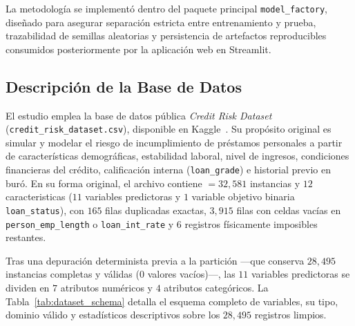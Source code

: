 \documentclass[conference]{IEEEtran}
\begin{document}
La metodología se implementó dentro del paquete principal \texttt{model\_factory}, diseñado para asegurar separación estricta entre entrenamiento y prueba, trazabilidad de semillas aleatorias y persistencia de artefactos reproducibles consumidos posteriormente por la aplicación web en Streamlit.

\subsection{Descripción de la Base de Datos}

El estudio emplea la base de datos pública \textit{Credit Risk Dataset} (\texttt{credit\_risk\_dataset.csv}), disponible en Kaggle~\cite{laotse_credit_risk}. Su propósito original es simular y modelar el riesgo de incumplimiento de préstamos personales a partir de características demográficas, estabilidad laboral, nivel de ingresos, condiciones financieras del crédito, calificación interna (\texttt{loan\_grade}) e historial previo en buró. En su forma original, el archivo contiene $=32{,}581$ instancias y $12$ caracteristicas ($11$ variables predictoras y $1$ variable objetivo binaria \texttt{loan\_status}), con $165$ filas duplicadas exactas, $3{,}915$ filas con celdas vacías en \texttt{person\_emp\_length} o \texttt{loan\_int\_rate} y $6$ registros físicamente imposibles restantes.

Tras una depuración determinista previa a la partición —que conserva $28{,}495$ instancias completas y válidas ($0$ valores vacíos)—, las $11$ variables predictoras se dividen en $7$ atributos numéricos y $4$ atributos categóricos. La Tabla~\ref{tab:dataset_schema} detalla el esquema completo de variables, su tipo, dominio válido y estadísticos descriptivos sobre los $28{,}495$ registros limpios.
\end{document}
